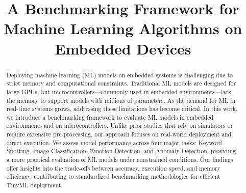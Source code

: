 \documentclass[conference]{IEEEtran}
\begin{document}
\title{A Benchmarking Framework for Machine Learning Algorithms on Embedded Devices\\

}

\author{
\and
{}
\and
{}
}

\maketitle

\begin{abstract}
Deploying machine learning (ML) models on embedded systems is challenging due to strict memory and computational constraints. Traditional ML models are designed for large GPUs, but microcontrollers—commonly used in embedded environments—lack the memory to support models with millions of parameters. As the demand for ML in real-time systems grows, addressing these limitations has become critical. In this work, we introduce a benchmarking framework to evaluate ML models in embedded environments and on microcontrollers. Unlike prior studies that rely on simulators or require extensive pre-processing, our approach focuses on real-world deployment and direct execution. We assess model performance across four major tasks: Keyword Spotting, Image Classification, Emotion Detection, and Anomaly Detection, providing a more practical evaluation of ML models under constrained conditions. Our findings offer insights into the trade-offs between accuracy, execution speed, and memory efficiency, contributing to standardized benchmarking methodologies for efficient TinyML deployment.


\end{abstract}
\end{document}
